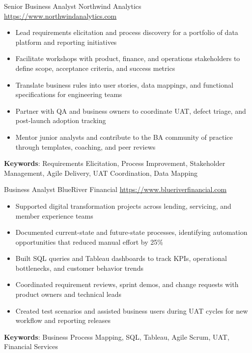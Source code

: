 \documentclass[a4paper, serif, 10pt]{moderncv}
\begin{document}
        {Senior Business Analyst}
        {Northwind Analytics}
        {\url{https://www.northwindanalytics.com}}
        {}
        {\begin{itemize}
\item Lead requirements elicitation and process discovery for a portfolio of data platform and reporting initiatives
\item Facilitate workshops with product, finance, and operations stakeholders to define scope, acceptance criteria, and success metrics
\item Translate business rules into user stories, data mappings, and functional specifications for engineering teams
\item Partner with QA and business owners to coordinate UAT, defect triage, and post-launch adoption tracking
\item Mentor junior analysts and contribute to the BA community of practice through templates, coaching, and peer reviews
\end{itemize}
\textbf{Keywords}: Requirements Elicitation, Process Improvement, Stakeholder Management, Agile Delivery, UAT Coordination, Data Mapping}

        {Business Analyst}
        {BlueRiver Financial}
        {\url{https://www.blueriverfinancial.com}}
        {}
        {\begin{itemize}
\item Supported digital transformation projects across lending, servicing, and member experience teams
\item Documented current-state and future-state processes, identifying automation opportunities that reduced manual effort by 25\%
\item Built SQL queries and Tableau dashboards to track KPIs, operational bottlenecks, and customer behavior trends
\item Coordinated requirement reviews, sprint demos, and change requests with product owners and technical leads
\item Created test scenarios and assisted business users during UAT cycles for new workflow and reporting releases
\end{itemize}
\textbf{Keywords}: Business Process Mapping, SQL, Tableau, Agile Scrum, UAT, Financial Services}
\end{document}
